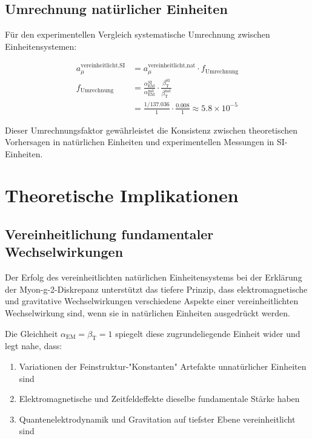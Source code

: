 \documentclass[12pt,a4paper]{article}
\newcommand{\alphaEM}{\alpha_{\text{EM}}}
\newcommand{\betaT}{\beta_{\text{T}}}
\begin{document}
	\subsection{Umrechnung natürlicher Einheiten}
	
	Für den experimentellen Vergleich systematische Umrechnung zwischen Einheitensystemen:
	
	\begin{align}
		a_\mu^{\text{vereinheitlicht,SI}} &= a_\mu^{\text{vereinheitlicht,nat}} \cdot f_{\text{Umrechnung}} \\
		f_{\text{Umrechnung}} &= \frac{\alphaEM^{\text{SI}}}{\alphaEM^{\text{nat}}} \cdot \frac{\betaT^{\text{SI}}}{\betaT^{\text{nat}}} \\
		&= \frac{1/137.036}{1} \cdot \frac{0.008}{1} \approx 5.8 \times 10^{-5}
	\end{align}
	
	Dieser Umrechnungsfaktor gewährleistet die Konsistenz zwischen theoretischen Vorhersagen in natürlichen Einheiten und experimentellen Messungen in SI-Einheiten.
	
	\section{Theoretische Implikationen}
	
	\subsection{Vereinheitlichung fundamentaler Wechselwirkungen}
	\label{subsec:fundamental_unification}
	
	Der Erfolg des vereinheitlichten natürlichen Einheitensystems bei der Erklärung der Myon-g-2-Diskrepanz unterstützt das tiefere Prinzip, dass elektromagnetische und gravitative Wechselwirkungen verschiedene Aspekte einer vereinheitlichten Wechselwirkung sind, wenn sie in natürlichen Einheiten ausgedrückt werden.
	
	Die Gleichheit $\alphaEM = \betaT = 1$ spiegelt diese zugrundeliegende Einheit wider und legt nahe, dass:
	
	\begin{enumerate}
		\item Variationen der Feinstruktur-"Konstanten" Artefakte unnatürlicher Einheiten sind
		\item Elektromagnetische und Zeitfeldeffekte dieselbe fundamentale Stärke haben
		\item Quantenelektrodynamik und Gravitation auf tiefster Ebene vereinheitlicht sind
	\end{enumerate}
	
\end{document}
